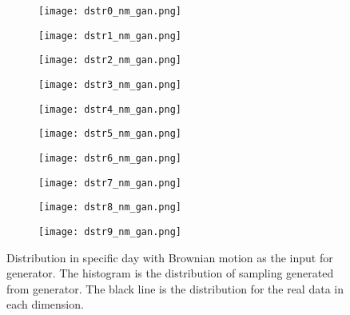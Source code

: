 \documentclass{article}
\begin{document}
	\begin{figure}
		\begin{subfigure}[b]{0.3\textwidth}
			\texttt{[image: dstr0\_nm\_gan.png]}
		\end{subfigure}
		\hfill
		\begin{subfigure}[b]{0.3\textwidth}
			\texttt{[image: dstr1\_nm\_gan.png]}
			
		\end{subfigure}
		\hfill
		\begin{subfigure}[b]{0.3\textwidth}
			\texttt{[image: dstr2\_nm\_gan.png]}
		\end{subfigure}
		
		\begin{subfigure}[b]{0.3\textwidth}
			\texttt{[image: dstr3\_nm\_gan.png]}
			
		\end{subfigure}
		\hfill
		\begin{subfigure}[b]{0.3\textwidth}
			\texttt{[image: dstr4\_nm\_gan.png]}
		\end{subfigure}
		\hfill
		\begin{subfigure}[b]{0.3\textwidth}
			\texttt{[image: dstr5\_nm\_gan.png]}
		\end{subfigure}
		
		\begin{subfigure}[b]{0.3\textwidth}
			\texttt{[image: dstr6\_nm\_gan.png]}
		\end{subfigure}
		\hfill
		\begin{subfigure}[b]{0.3\textwidth}
			\texttt{[image: dstr7\_nm\_gan.png]}
		\end{subfigure}
		\hfill
		\begin{subfigure}[b]{0.3\textwidth}
			\texttt{[image: dstr8\_nm\_gan.png]}
		\end{subfigure}
		\begin{subfigure}[b]{0.3\textwidth}
			\texttt{[image: dstr9\_nm\_gan.png]}
		\end{subfigure}
		\caption{Distribution in specific day with Brownian motion as the input for generator. The histogram is the distribution of sampling generated from generator. The black line is the distribution for the real data in each dimension.}
		\label{fig:dstr_nm}
	\end{figure}
\end{document}
